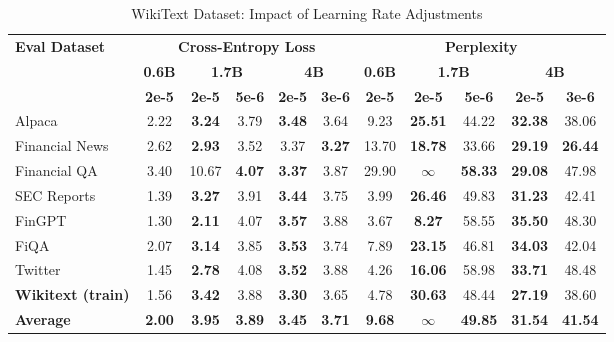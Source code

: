 
\begin{table}[h]
\centering
\caption[WikiText: Learning Rate Comparison]{WikiText Dataset: Impact of Learning Rate Adjustments}
\label{tab:wikitext_lr_comparison}
\begin{tabular}{l|c|cc|cc|c|cc|cc}
\hline
\multirow{3}{*}{\textbf{Eval Dataset}} &
\multicolumn{5}{c|}{\textbf{Cross-Entropy Loss}} &
\multicolumn{5}{c}{\textbf{Perplexity}} \\
\cline{2-6} \cline{7-11}
& \textbf{0.6B} & \multicolumn{2}{c|}{\textbf{1.7B}} & \multicolumn{2}{c|}{\textbf{4B}} &
 \textbf{0.6B} & \multicolumn{2}{c|}{\textbf{1.7B}} & \multicolumn{2}{c}{\textbf{4B}} \\
\cline{3-4} \cline{5-6} \cline{8-9} \cline{10-11}
& \textbf{2e-5} & \textbf{2e-5} & \textbf{5e-6} & \textbf{2e-5} & \textbf{3e-6} &
 \textbf{2e-5} & \textbf{2e-5} & \textbf{5e-6} & \textbf{2e-5} & \textbf{3e-6} \\
\hline
 Alpaca & 2.22 & \textbf{3.24} & 3.79 & \textbf{3.48} & 3.64 & 9.23 & \textbf{25.51} & 44.22 & \textbf{32.38} & 38.06 \\
Financial News & 2.62 & \textbf{2.93} & 3.52 & 3.37 & \textbf{3.27} & 13.70 & \textbf{18.78} & 33.66 & \textbf{29.19} & \textbf{26.44} \\
 Financial QA & 3.40 & 10.67 & \textbf{4.07} & \textbf{3.37} & 3.87 & 29.90 & $\infty$ & \textbf{58.33} & \textbf{29.08} & 47.98 \\
 SEC Reports & 1.39 & \textbf{3.27} & 3.91 & \textbf{3.44} & 3.75 & 3.99 & \textbf{26.46} & 49.83 & \textbf{31.23} & 42.41 \\
 FinGPT & 1.30 & \textbf{2.11} & 4.07 & \textbf{3.57} & 3.88 & 3.67 & \textbf{8.27} & 58.55 & \textbf{35.50} & 48.30 \\
 FiQA & 2.07 & \textbf{3.14} & 3.85 & \textbf{3.53} & 3.74 & 7.89 & \textbf{23.15} & 46.81 & \textbf{34.03} & 42.04 \\
Twitter & 1.45 & \textbf{2.78} & 4.08 & \textbf{3.52} & 3.88 & 4.26 & \textbf{16.06} & 58.98 & \textbf{33.71} & 48.48 \\
\rowcolor{gray!20} \textbf{Wikitext (train)} & 1.56 & \textbf{3.42} & 3.88 & \textbf{3.30} & 3.65 & 4.78 & \textbf{30.63} & 48.44 & \textbf{27.19} & 38.60 \\
\rowcolor{blue!10} \textbf{Average} & \textbf{2.00} & \textbf{3.95} & \textbf{3.89} & \textbf{3.45} & \textbf{3.71} & \textbf{9.68} & \textbf{$\infty$} & \textbf{49.85} & \textbf{31.54} & \textbf{41.54}  \\
\hline
\end{tabular}
\end{table}
